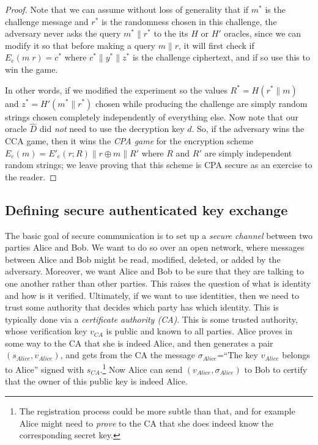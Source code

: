 \begin{proof}
Note that we can assume without loss of generality that if \(m^*\) is
the challenge message and \(r^*\) is the randomness chosen in this
challenge, the adversary never asks the query \(m^*\|r^*\) to the its
\(H\) or \(H'\) oracles, since we can modify it so that before making a
query \(m\|r\), it will first check if \(E_e(m\;r)=c^*\) where
\(c^*\|y^*\|z^*\) is the challenge ciphertext, and if so use this to win
the game.

In other words, if we modified the experiment so the values
\(R^*=H(r^*\|m)\) and \(z^*=H'(m^*\|r^*)\) chosen while producing the
challenge are simply random strings chosen completely independently of
everything else. Now note that our oracle \(\hat{D}\) did \emph{not}
need to use the decryption key \(d\). So, if the adversary wins the CCA
game, then it wins the \emph{CPA game} for the encryption scheme
\(E_e(m) = E'_e(r;R)\| r \oplus m \| R'\) where \(R\) and \(R'\) are
simply independent random strings; we leave proving that this scheme is
CPA secure as an exercise to the reader.

\end{proof}

\subsection{Defining secure authenticated key
exchange}\label{Defining-secure-authentic}

The basic goal of secure communication is to set up a \emph{secure
channel} between two parties Alice and Bob. We want to do so over an
open network, where messages between Alice and Bob might be read,
modified, deleted, or added by the adversary. Moreover, we want Alice
and Bob to be sure that they are talking to one another rather than
other parties. This raises the question of what is identity and how is
it verified. Ultimately, if we want to use identities, then we need to
trust some authority that decides which party has which identity. This
is typically done via a \emph{certificate authority (CA)}. This is some
trusted authority, whose verification key \(v_{CA}\) is public and known
to all parties. Alice proves in some way to the CA that she is indeed
Alice, and then generates a pair \((s_{Alice},v_{Alice})\), and gets
from the CA the message \(\sigma_{Alice}\)=``The key \(v_{Alice}\)
belongs to Alice'' signed with \(s_{CA}\).\footnote{The registration
  process could be more subtle than that, and for example Alice might
  need to \emph{prove} to the CA that she does indeed know the
  corresponding secret key.} Now Alice can send
\((v_{Alice},\sigma_{Alice})\) to Bob to certify that the owner of this
public key is indeed Alice.

